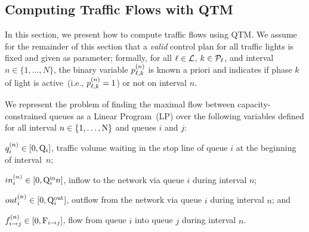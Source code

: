 %
%
%
%
%



\subsection{Computing Traffic Flows with QTM}

In this section, we present how to compute traffic flows using QTM.
%
We assume for the remainder of this section that a \emph{valid} control plan for
all traffic lights is fixed and given as parameter;
%
formally, for all $\ell \in \mathcal{L}$, $k \in \mathcal{P}_\ell$, and interval $n \in
\{1,\dots,N\}$, the binary variable $p_{\ell,k}^{(n)}$ is known a priori and indicates
if phase $k$ of light \tl is active~(i.e., $p_{\ell,k}^{(n)} = 1$) or not on interval
$n$.


We represent the problem of finding the maximal flow between
capacity-constrained queues as a Linear Program~(LP) over the following
variables defined for all interval $n \in \{1,\dots,\mathrm{N}\}$ and queues $i$ and
$j$:
%
\begin{itemize*}[label={}]
%
\item $q_{i}^{(n)} \in [0,\mathrm{Q}_{i}]$, traffic volume waiting in the stop line of queue
  $i$ at the beginning of interval~$n$;
%
\item $in_{i}^{(n)} \in [0,\mathrm{Q}_{i}^{\mathrm{in}}{n}]$, inflow to the network via queue $i$ during
  interval $n$;
%
\item $out_{i}^{(n)} \in [0,\mathrm{Q}_{i}^{\mathrm{out}}]$, outflow from the network via queue $i$ during
  interval $n$; and
%
\item $f_{i\to j}^{(n)} \in [0,\mathrm{F}_{i\to j}]$, flow from queue $i$ into queue $j$ during
  interval $n$.
%
\end{itemize*}




